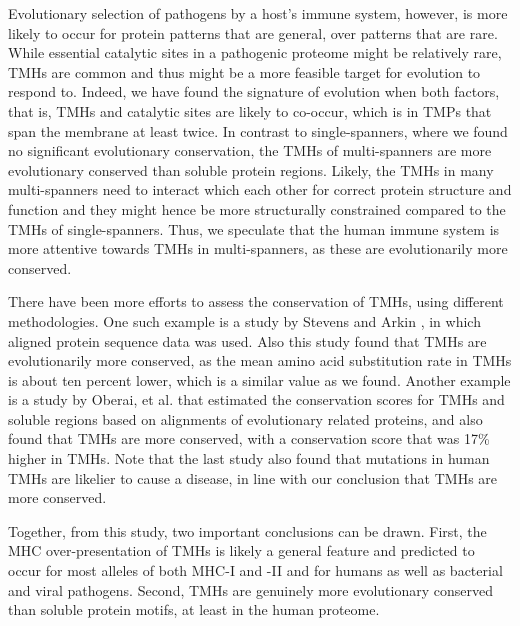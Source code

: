 Evolutionary selection of pathogens by a host's immune system,
however, is more likely to occur for protein patterns that are general,
over patterns that are rare.
While essential catalytic sites in a pathogenic proteome
might be relatively rare, TMHs are common and thus might be a more feasible 
target for evolution to respond to.
Indeed, we have found the signature of evolution when both factors,
that is, TMHs and catalytic sites are likely to co-occur,
which is in TMPs that span the membrane at least twice.
In contrast to single-spanners, where we found no significant evolutionary conservation, 
the TMHs of multi-spanners are more evolutionary conserved than soluble protein regions. 
Likely, the TMHs in many multi-spanners need to interact which each other 
for correct protein structure and function 
and they might hence be more structurally constrained 
compared to the TMHs of single-spanners.
Thus, we speculate that the human immune system is more attentive 
towards TMHs in multi-spanners, as these are evolutionarily more conserved. 

There have been more efforts to assess the conservation of TMHs,
using different methodologies.
One such example is a study by Stevens and Arkin \cite{stevens2001substitution}, 
in which aligned protein sequence data was used.
Also this study found that TMHs are evolutionarily more conserved,
as the mean amino acid substitution rate in TMHs is about ten
percent lower,
which is a similar value as we found.
Another example is a study by Oberai, et al. \cite{oberai2009structural} that estimated the conservation
scores for TMHs and soluble regions based on 
alignments of evolutionary related proteins,
and also found that TMHs are more conserved, 
with a conservation score that was 17\% higher in 
TMHs.
Note that the last study also found that mutations in human TMHs are likelier to cause
a disease, in line with our conclusion that TMHs are more conserved.


Together, from this study, two important conclusions can be drawn. 
First, the MHC over-presentation of TMHs is likely a general feature 
and predicted to occur for most alleles of both MHC-I and -II 
and for humans as well as bacterial and viral pathogens. 
Second, TMHs are genuinely more evolutionary conserved than soluble protein motifs, 
at least in the human proteome. 

